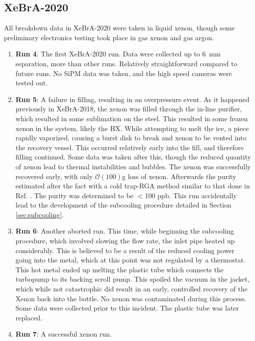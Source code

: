\subsection{XeBrA-2020}

All breakdown data in XeBrA-2020 were taken in liquid xenon, though some preliminary electronics testing took place in gas xenon and gas argon.

\begin{enumerate}
    \item \textbf{Run 4}: The first XeBrA-2020 run.
    Data were collected up to 6~mm separation, more than other runs. 
    Relatively straightforward compared to future runs. No SiPM data was taken, and the high speed cameras were tested out.
    \item \textbf{Run 5}: A failure in filling, resulting in an overpressure event.
    As it happened previously in XeBrA-2018, the xenon was filled through the in-line purifier, which resulted in some sublimation on the steel. This resulted in some frozen xenon in the system, likely the HX.
    While attempting to melt the ice, a piece rapidly vaporized, causing a burst disk to break and xenon to be vented into the recovery vessel.
    This occurred relatively early into the fill, and therefore filling continued.
    Some data was taken after this, though the reduced quantity of xenon lead to thermal instabilities and bubbles.
    The xenon was successfully recovered early, with only $\mathcal{O}(100)$g loss of xenon.
    Afterwards the purity estimated after the fact with a cold trap-RGA method similar to that done in Ref. \cite{leonard_simple_2010}. 
    The purity was determined to be $<$100 ppb.
    This run accidentally lead to the development of the subcooling procedure detailed in Section \ref{sec:subcooling}.
    \item \textbf{ Run 6}: Another aborted run. This time, while beginning the subcooling procedure, which involved slowing the flow rate, the inlet pipe heated up considerably.
    This is believed to be a result of the reduced cooling power going into the metal, which at this point was not regulated by a thermostat.
    This hot metal ended up melting the plastic tube which connects the turbopump  to its backing scroll pump.
    This spoiled the vacuum in the jacket, which while not catastrophic did result in an early, controlled recovery of the Xenon back into the bottle.
    No xenon was contaminated during this process.
    Some data were collected prior to this incident.
    The plastic tube was later replaced.
    \item \textbf{Run 7}: A successful xenon run.

\end{enumerate}
